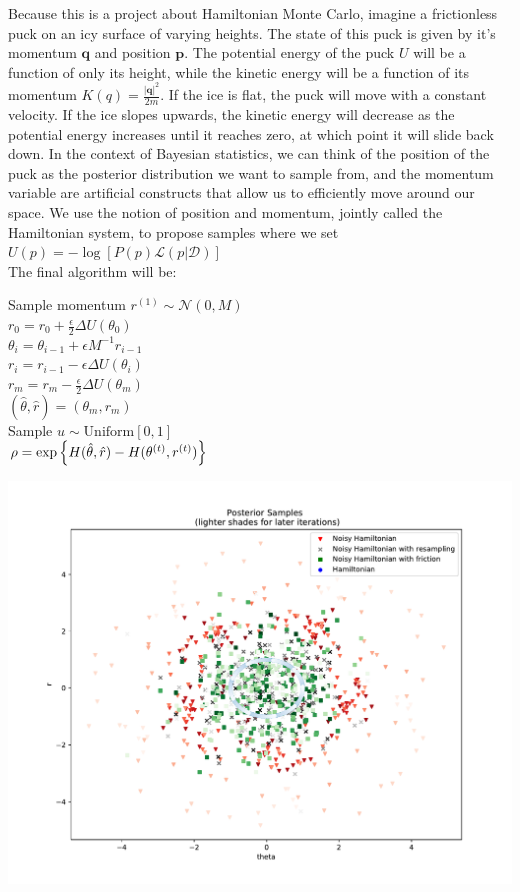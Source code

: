 Because this is a project about Hamiltonian Monte Carlo, imagine a frictionless puck on an icy surface of varying heights. The state of this puck is given by it's momentum $\bm{q}$ and position $\bm{p}$. The potential energy of the puck $U$ will be a function of only its height, while the kinetic energy will be a function of its momentum $K(q)=\frac{|\bm{q}|^2}{2m}$. If the ice is flat, the puck will move with a constant velocity. If the ice slopes upwards, the kinetic energy will decrease as the potential energy increases until it reaches zero, at which point it will slide back down. In the context of Bayesian statistics, we can think of the position of the puck as the posterior distribution we want to sample from, and the momentum variable are artificial constructs that allow us to efficiently move around our space. We use the notion of position and momentum, jointly called the Hamiltonian system, to propose samples where we set $U(p) = -\log[P(p)\mathcal{L}(p|\mathcal{D})]$\\

The final algorithm will be:

\begin{algorithm}[H]
	 {
		Sample momentum $r^{(1)}\sim\mathcal{N}(0, M)$\\
		$r_0=r_0+\frac{\epsilon}{2}\Delta U(\theta_0)$\\
		 {
			$\theta_i=\theta_{i-1}+\epsilon M^{-1}r_{i-1}$\\
			$r_i = r_{i-1} - \epsilon  \Delta U(\theta_i)$\\
		}
		$r_m = r_m -\frac{\epsilon}{2}\Delta U(\theta_m)$\\
		$(\hat{\theta}, \hat{r})=(\theta_m,r_m)$\\
		Sample $u\sim\mathrm{Uniform}[0, 1]$\\
		$\rho = \exp\left\lbrace H(\hat{\theta}, \hat{r})-H(\theta^{(t)}, r^{(t)}) \right\rbrace$\\
	}
\end{algorithm}




\includegraphics[width=\textwidth]{posterior_samples.pdf}